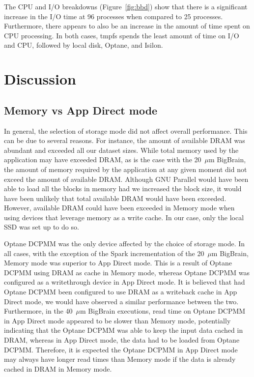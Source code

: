 \documentclass[conference]{IEEEtran}
\newcommand{\bigbrain}{BigBrain\xspace}
\begin{document}
The CPU and I/O breakdowns (Figure~\ref{fig:bbd}) show that there is a significant increase
in the I/O time at 96 processes when compared to 25 processes. Furthermore, there appears
to also be an increase in the amount of time spent on CPU processing. In both cases,
tmpfs spends the least amount of time on I/O and CPU, followed by local disk, Optane, and Isilon.
\section{Discussion}
\subsection{Memory vs App Direct mode}

In general, the selection of storage mode did not affect overall performance. This can be
due to several reasons. For instance, the amount of available DRAM was abundant and exceeded 
all our dataset sizes. While total memory used by the application may have exceeded DRAM, as is the
case with the 20~$\mu$m \bigbrain, the amount of memory required by the application at any 
given moment did not exceed the amount of available DRAM. Although GNU Parallel would have
been able to load all the blocks in memory had we increased the block size, it would have been unlikely
that total available DRAM would have been exceeded. However, available DRAM could have been exceeded in
Memory mode when using devices that leverage memory as a write cache.
In our case, only the local SSD was set up to do so.

Optane DCPMM was the only device affected by the choice of storage mode. In all cases, with the 
exception of the Spark incrementation of the 20~$\mu$m \bigbrain, Memory mode was superior to 
App Direct mode. This is a result of Optane DCPMM using DRAM as cache in Memory mode, whereas Optane
DCPMM 
was configured as a writethrough device in App Direct mode. It is believed that had Optane DCPMM been
configured to use DRAM as a writeback cache in App Direct mode, we would have observed a similar
performance between the two. Furthermore, in the 40~$\mu$m \bigbrain executions, read time on Optane DCPMM in
App Direct mode appeared to be slower than Memory mode, potentially indicating that the Optane DCPMM was able
to keep the input data cached in DRAM, whereas in App Direct mode, the data had to be loaded from Optane DCPMM.
Therefore, it is expected the Optane DCPMM in App Direct mode may always have longer read times than Memory mode
if the data is already cached in DRAM in Memory mode.
\end{document}
